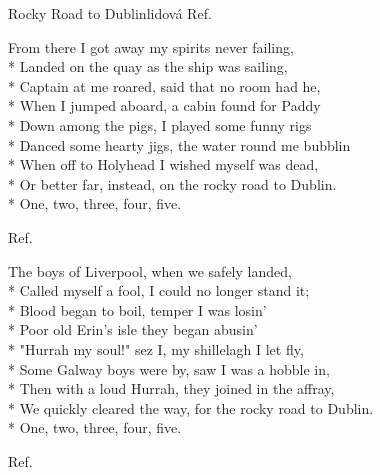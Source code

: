\documentclass[10.5pt]{book}
\begin{document}
\begin{poem}{Rocky Road to Dublin}{lidová}
Ref.

From there I got away my spirits never failing,\\*
Landed on the quay as the ship was sailing,\\*
Captain at me roared, said that no room had he,\\*
When I jumped aboard, a cabin found for Paddy\\*
Down among the pigs, I played some funny rigs\\*
Danced some hearty jigs, the water round me \mbox{bubblin}\\*
When off to Holyhead I wished myself was dead,\\*
Or better far, instead, on the rocky road to Dublin.\\*
One, two, three, four, five. 

Ref.

The boys of Liverpool, when we safely landed,\\*
Called myself a fool, I could no longer stand it;\\*
Blood began to boil, temper I was losin'\\*
Poor old Erin's isle they began abusin'\\*
"Hurrah my soul!" sez I, my shillelagh I let fly,\\*
Some Galway boys were by, saw I was a hobble in,\\*
Then with a loud Hurrah, they joined in the affray,\\*
We quickly cleared the way, for the rocky road to Dublin.\\*
One, two, three, four, five. 

Ref.

\end{poem}
\fi
\iffalse
\end{document}
